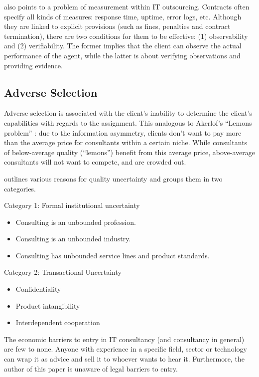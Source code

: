 \documentclass[12pt]{article}
\providecommand{\tightlist}{%
  \setlength{\itemsep}{0pt}\setlength{\parskip}{0pt}}
\begin{document}
\citet[59]{aubert1996} also points to a problem of measurement within IT
outsourcing. Contracts often specify all kinds of measures: response
time, uptime, error logs, etc. Although they are linked to explicit
provisions (such as fines, penalties and contract termination), there
are two conditions for them to be effective: (1) observability and (2)
verifiability. The former implies that the client can observe the actual
performance of the agent, while the latter is about verifying
observations and providing evidence.

\hypertarget{adverse-selection}{%
\subsection{Adverse Selection}\label{adverse-selection}}

Adverse selection is associated with the client's inability to determine
the client's capabilities with regards to the assignment. This analogous
to Akerlof's ``Lemons problem'' \citeyearpar{akerlof1970}: due to the
information asymmetry, clients don't want to pay more than the average
price for consultants within a certain niche. While consultants of
below-average quality (``lemons'') benefit from this average price,
above-average consultants will not want to compete, and are crowded out.

\citep[ 69-75]{armbruster2006} outlines various reasons for quality
uncertainty and groups them in two categories.

Category 1: Formal institutional uncertainty

\begin{itemize}
\tightlist
\item
  Consulting is an unbounded profession.
\item
  Consulting is an unbounded industry.
\item
  Consulting has unbounded service lines and product standards.
\end{itemize}

Category 2: Transactional Uncertainty

\begin{itemize}
\tightlist
\item
  Confidentiality
\item
  Product intangibility
\item
  Interdependent cooperation
\end{itemize}

The economic barriers to entry \citep[ 463]{fee2004} in IT consultancy
(and consultancy in general) are few to none. Anyone with experience in
a specific field, sector or technology can wrap it as advice and sell it
to whoever wants to hear it. Furthermore, the author of this paper is
unaware of legal barriers to entry.
\end{document}
